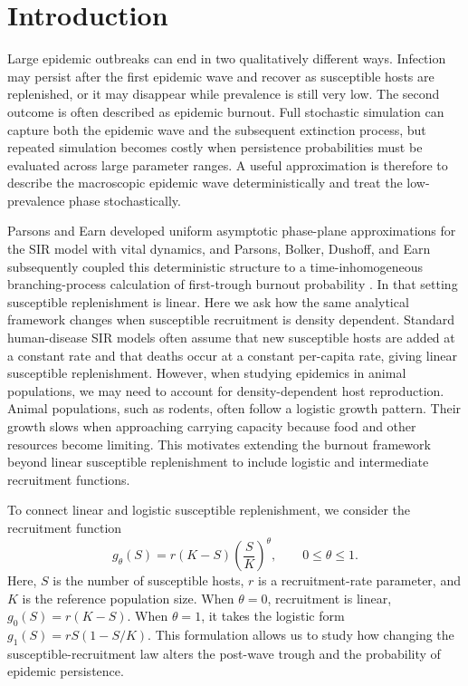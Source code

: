\documentclass[11pt]{article}
\begin{document}
\section{Introduction}


Large epidemic outbreaks can end in two qualitatively different ways. Infection may persist after the first epidemic wave and recover as susceptible hosts are replenished, or it may disappear while prevalence is still very low. The second outcome is often described as epidemic burnout. Full stochastic simulation can capture both the epidemic wave and the subsequent extinction process, but repeated simulation becomes costly when persistence probabilities must be evaluated across large parameter ranges. A useful approximation is therefore to describe the macroscopic epidemic wave deterministically and treat the low-prevalence phase stochastically.

Parsons and Earn developed uniform asymptotic phase-plane approximations for the SIR model with vital dynamics, and Parsons, Bolker, Dushoff, and Earn subsequently coupled this deterministic structure to a time-inhomogeneous branching-process calculation of first-trough burnout probability \cite{ParsonsEarn2024,ParsonsEtAl2024}. In that setting susceptible replenishment is linear. Here we ask how the same analytical framework changes when susceptible recruitment is density dependent. Standard human-disease SIR models often assume that new susceptible hosts are added at a constant rate and that deaths occur at a constant per-capita rate, giving linear susceptible replenishment. However, when studying epidemics in animal populations, we may need to account for density-dependent host reproduction. Animal populations, such as rodents, often follow a logistic growth pattern. Their growth slows when approaching carrying capacity because food and other resources become limiting. This motivates extending the burnout framework beyond linear susceptible replenishment to include logistic and intermediate recruitment functions.

To connect linear and logistic susceptible replenishment, we consider the recruitment function
\begin{equation}
g_\theta(S)=r(K-S)\left(\frac{S}{K}\right)^\theta,\qquad 0\leq\theta\leq1.
\label{eq:dimensional-recruitment}
\end{equation}
Here, \(S\) is the number of susceptible hosts, \(r\) is a recruitment-rate parameter, and \(K\) is the reference population size. When \(\theta=0\), recruitment is linear, \(g_0(S)=r(K-S)\). When \(\theta=1\), it takes the logistic form \(g_1(S)=rS(1-S/K)\). This formulation allows us to study how changing the susceptible-recruitment law alters the post-wave trough and the probability of epidemic persistence.
\end{document}
